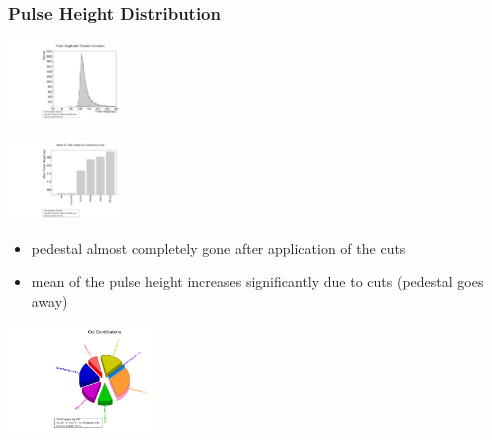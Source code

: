 \documentclass[9pt]{beamer}
\begin{document}
\begin{frame}
	\frametitle{Pulse Height Distribution}
	\begin{minipage}{4cm}
		\centering 
		\includegraphics[angle=270, width=3.0cm]{Landau}
	\end{minipage}
	\hspace*{2pt}
	\begin{minipage}{6.5cm}
		\centering
		\includegraphics[angle=270, width=3.0cm]{CutMeans}
	\end{minipage}
	\begin{minipage}{6cm}
		\begin{itemize}
			\item pedestal almost completely gone after application of the cuts 
			\item mean of the pulse height increases significantly due to cuts (pedestal goes away)
		\end{itemize}
	\end{minipage}
	\hspace*{2pt}
	\begin{minipage}{5cm}
		\centering
		\includegraphics[angle=270, width=4cm]{Cuts}
	\end{minipage}
\end{frame}
\end{document}
